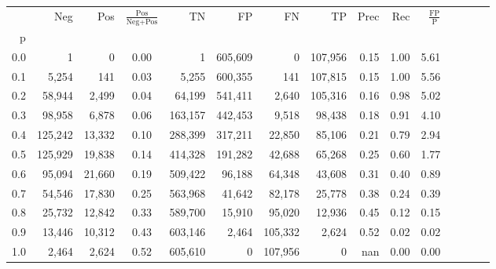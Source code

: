 \begin{tabular}{rrrcrrrrrrrrrrr}
\toprule
{} &      Neg &     Pos & $\frac{\text{Pos}}{\text{Neg}+\text{Pos}}$ &       TN &       FP &       FN &       TP &  Prec &   Rec & $\frac{\text{FP}}{\text{P}}$ \\
p   &          &         &                                            &          &          &          &          &       &       &                              \\
\midrule
0.0 &        1 &       0 &                                       0.00 &        1 &  605,609 &        0 &  107,956 &  0.15 &  1.00 &                         5.61 \\
0.1 &    5,254 &     141 &                                       0.03 &    5,255 &  600,355 &      141 &  107,815 &  0.15 &  1.00 &                         5.56 \\
0.2 &   58,944 &   2,499 &                                       0.04 &   64,199 &  541,411 &    2,640 &  105,316 &  0.16 &  0.98 &                         5.02 \\
0.3 &   98,958 &   6,878 &                                       0.06 &  163,157 &  442,453 &    9,518 &   98,438 &  0.18 &  0.91 &                         4.10 \\
0.4 &  125,242 &  13,332 &                                       0.10 &  288,399 &  317,211 &   22,850 &   85,106 &  0.21 &  0.79 &                         2.94 \\
0.5 &  125,929 &  19,838 &                                       0.14 &  414,328 &  191,282 &   42,688 &   65,268 &  0.25 &  0.60 &                         1.77 \\
0.6 &   95,094 &  21,660 &                                       0.19 &  509,422 &   96,188 &   64,348 &   43,608 &  0.31 &  0.40 &                         0.89 \\
0.7 &   54,546 &  17,830 &                                       0.25 &  563,968 &   41,642 &   82,178 &   25,778 &  0.38 &  0.24 &                         0.39 \\
0.8 &   25,732 &  12,842 &                                       0.33 &  589,700 &   15,910 &   95,020 &   12,936 &  0.45 &  0.12 &                         0.15 \\
0.9 &   13,446 &  10,312 &                                       0.43 &  603,146 &    2,464 &  105,332 &    2,624 &  0.52 &  0.02 &                         0.02 \\
1.0 &    2,464 &   2,624 &                                       0.52 &  605,610 &        0 &  107,956 &        0 &   nan &  0.00 &                         0.00 \\
\bottomrule
\end{tabular}
